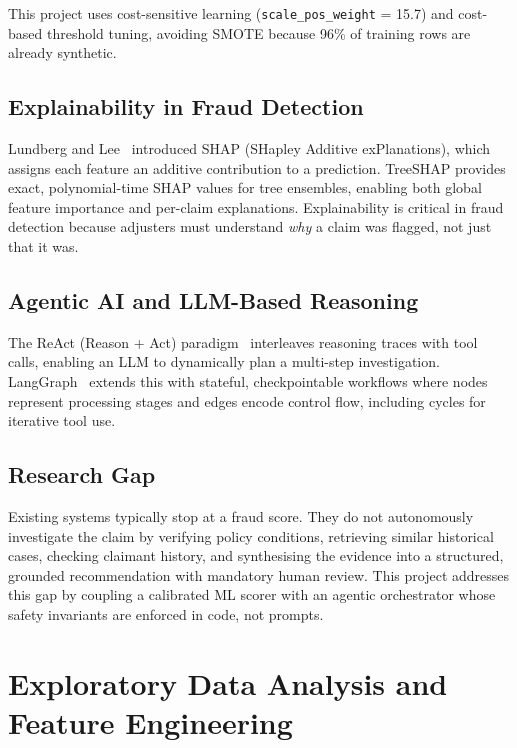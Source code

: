 \documentclass[12pt,a4paper]{article}
\begin{document}
This project uses cost-sensitive learning (\texttt{scale\_pos\_weight} = 15.7) and cost-based threshold tuning, avoiding SMOTE because 96\% of training rows are already synthetic.

\subsection{Explainability in Fraud Detection}

Lundberg and Lee~\cite{ref:lundberg2017} introduced SHAP (SHapley Additive exPlanations), which assigns each feature an additive contribution to a prediction.  TreeSHAP provides exact, polynomial-time SHAP values for tree ensembles, enabling both global feature importance and per-claim explanations.  Explainability is critical in fraud detection because adjusters must understand \textit{why} a claim was flagged, not just that it was.

\subsection{Agentic AI and LLM-Based Reasoning}

The ReAct (Reason + Act) paradigm~\cite{ref:yao2023} interleaves reasoning traces with tool calls, enabling an LLM to dynamically plan a multi-step investigation.  LangGraph~\cite{ref:langgraph2024} extends this with stateful, checkpointable workflows where nodes represent processing stages and edges encode control flow, including cycles for iterative tool use.

\subsection{Research Gap}

Existing systems typically stop at a fraud score.  They do not autonomously investigate the claim by verifying policy conditions, retrieving similar historical cases, checking claimant history, and synthesising the evidence into a structured, grounded recommendation with mandatory human review.  This project addresses this gap by coupling a calibrated ML scorer with an agentic orchestrator whose safety invariants are enforced in code, not prompts.


\newpage
\section{Exploratory Data Analysis and Feature Engineering}
\label{ch:eda}
\end{document}
